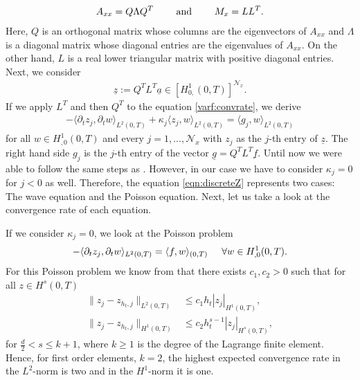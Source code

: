 \documentclass[a4paper,11pt]{article}
\renewcommand{\vec}[1]{\underline{#1}}
\begin{document}
	\begin{align*}
		A_{xx} =Q\Lambda Q^T \qquad \textmd{ and } \qquad M_{x} = LL^T.
	\end{align*}
	Here, $Q$ is an orthogonal matrix whose columns are the eigenvectors of $A_{xx}$ and $\Lambda$ is a diagonal matrix whose diagonal entries are the  eigenvalues of $A_{xx}$. On the other hand, $L$ is a real lower triangular matrix with positive diagonal entries.
	Next, we consider 
	\begin{align}
		\label{eqn:z_transform_u}
		\underline{z}:= Q^TL^T \underline{a}\in [H^1_{0,}(0,T)]^{\mathcal N_x}.
	\end{align}
	If we apply $L^T $ and then $Q^T$  to the equation \eqref{varf:convrate}, we derive 
	\begin{align}
		\label{eqn:discreteZ}
		-\langle \partial_t z_{j} ,\partial_t w\rangle_{L^2(0,T)} +\kappa_j \langle  z_{j} , w\rangle_{L^2(0,T)} = \langle g_j , w\rangle_{L^2(0,T)}
	\end{align}
	for  all $w\in  H^1_{ ,0} (0, T )$ and  every $j=1,...,\mathcal N_x$ with $z_{j}$ as the $j$-th entry of $\vec z$. The right hand side $g_{j}$ is the $j$-th entry of the vector  $\underline{g} =Q^TL^T\underline{f}$.
	Until now we were able to follow the same steps as \cite[Sec.~5]{SteinbachZankETNA2020}. However, in our case we have to consider $\kappa_j=0$ for $j<0$ as well. Therefore, the equation \eqref{eqn:discreteZ} represents two cases: The wave equation and the Poisson equation. Next, let us take a look at the convergence rate of each equation.
	
	If we consider $\kappa_j= 0$, we look at the Poisson problem
	\begin{align*}
		-\langle\partial_tz_j,\partial_tw\rangle_{L^2(0,T)}=\langle f,w\rangle_{(0,T)} \hspace*{.5cm} \forall w\in H^1_{,0}(0,T).
	\end{align*}
	For this  Poisson problem we know from \cite[Thm.~32.2, Lem.~32.11]{ErnGuermond2020II} that there exists  $c_1,c_2>0$  such that for all $z\in H^s(0,T)$
	\begin{align*}
		\|z_j-{z}_{h_t,j}\|_{L^2(0,T)}&\leq c_1 h_t|z_j|_{H^1(0,T)},\\
		\|z_j-{z}_{h_t,j}\|_{H^1(0,T)}&\leq c_2 h_t^{s-1}|z_j|_{H^s(0,T)},
	\end{align*}
	for $\frac{d}{2}<s\leq k+1$, where $k\geq 1$ is the degree of the Lagrange finite element. Hence, for first order elements, $k=2$, the highest expected convergence rate in the $L^2$-norm is two and in the $H^1$-norm it is one.
	
\end{document}

